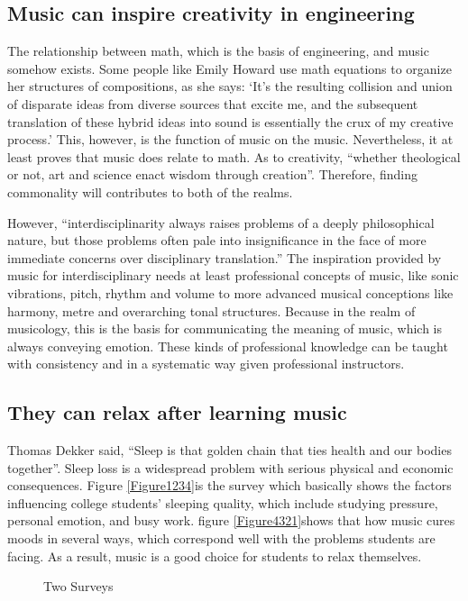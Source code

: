 \subsection{Music can inspire creativity in engineering}
The relationship between math, which is the basis of engineering, and music somehow exists. Some people like Emily Howard use math equations to organize her structures of compositions, as she says: ‘It’s the resulting collision and union of disparate ideas from diverse sources that excite me, and the subsequent translation of these hybrid ideas into sound is essentially the crux of my creative process.’ This, however, is the function of music on the music. Nevertheless, it at least proves that music does relate to math. As to creativity, “whether theological or not, art and science enact wisdom through creation”. Therefore, finding commonality will contributes to both of the realms.\par
However, “interdisciplinarity always raises problems of a deeply philosophical nature, but those problems often pale into insignificance in the face of more immediate concerns over disciplinary translation.” The inspiration provided by music for interdisciplinary needs at least professional concepts of music, like sonic vibrations, pitch, rhythm and volume to more advanced musical conceptions like harmony, metre and overarching tonal structures. Because in the realm of musicology, this is the basis for communicating the meaning of music, which is always conveying emotion. These kinds of professional knowledge can be taught with consistency and in a systematic way given professional instructors.\par
\subsection{They can relax after learning music}
Thomas Dekker said, “Sleep is that golden chain that ties health and our bodies together”. Sleep loss is a widespread problem with serious physical and economic consequences. Figure \ref{Figure1234}is the survey which basically shows the factors influencing college students’ sleeping quality, which include studying pressure, personal emotion, and busy work. figure \ref{Figure4321}shows that how music cures moods in several ways, which correspond well with the problems students are facing. As a result, music is a good choice for students to relax themselves.\par
\begin{figure} 
  \centering 
  \caption{Two Surveys} 
\end{figure}

